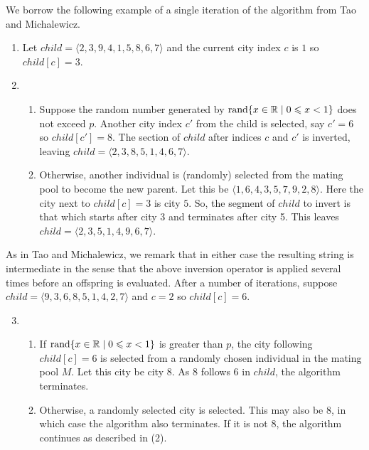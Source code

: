 We borrow the following example of a single iteration of the algorithm 
from Tao and Michalewicz.
\begin{enumerate}
	\item Let $child = \langle 2, 3, 9, 4, 1, 5, 8, 6, 7\rangle$ and the current
	city index $c$ is $1$ so $child[c] = 3$.
	\item \begin{enumerate}
		\item Suppose the random number generated by 
		 $\operatorname{rand}\{x \in \mathbb R \mid 0 \leqslant x < 1\}$
		 does not exceed $p$. Another city index $c'$ from the child is 
		 selected, say $c' = 6$ so $child[c'] = 8$. The section of $child$ 
		 after indices $c$ and $c'$ is inverted, leaving 
		 $child = \langle 2, 3, 8, 5, 1, 4, 6, 7 \rangle$.
		\item Otherwise, another individual is (randomly) selected from the
		mating pool to become the new parent. Let this be 
		$\langle 1, 6, 4, 3, 5, 7, 9, 2, 8 \rangle$. Here the city next to 
		$child[c] = 3$ is city $5$. So, the segment of $child$ to invert is 
		that which starts after city 3 and terminates after city 5. This 
		leaves $child = \langle 2, 3, 5, 1, 4, 9, 6, 7\rangle$.
	\end{enumerate}
\end{enumerate}
As in Tao and Michalewicz, we remark that in either case the resulting 
string is intermediate in the sense that the above inversion operator is 
applied several times before an offspring is evaluated. After a number
of iterations, suppose $child = \langle 9, 3, 6, 8, 5, 1, 4, 2, 7\rangle$ 
and $c = 2$ so $child[c] = 6$.
\begin{enumerate}
	\setcounter{enumi}{2}
	\item \begin{enumerate}
		\item  If $\operatorname{rand}\{x \in \mathbb R \mid 0 \leqslant x < 1\}$ is greater
		than $p$, the city following $child[c] = 6$ is selected from a 
		randomly chosen individual in the mating pool $M$. Let this 
		city be city $8$. As $8$ follows $6$ in $child$, the algorithm 
		terminates.
		\item Otherwise, a randomly selected city is selected. This may 
		also be $8$, in which case the algorithm also terminates. If it is 
		not $8$, the algorithm continues as described in (2).
	\end{enumerate}
\end{enumerate} 